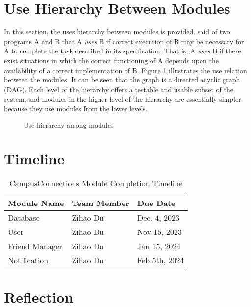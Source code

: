 \documentclass[12pt, titlepage]{article}
\begin{document}
\section{Use Hierarchy Between Modules} \label{SecUse}

In this section, the uses hierarchy between modules is
provided. \citet{Parnas1978} said of two programs A and B that A {\em uses} B if
correct execution of B may be necessary for A to complete the task described in
its specification. That is, A {\em uses} B if there exist situations in which
the correct functioning of A depends upon the availability of a correct
implementation of B.  Figure \ref{FigUH} illustrates the use relation between
the modules. It can be seen that the graph is a directed acyclic graph
(DAG). Each level of the hierarchy offers a testable and usable subset of the
system, and modules in the higher level of the hierarchy are essentially simpler
because they use modules from the lower levels.

\begin{figure}[H]
\centering
\caption{Use hierarchy among modules}
\label{FigUH}
\end{figure}

\section{Timeline}
\begin{table}[H]
\centering
\begin{tabular}{p{} p{}  p{}}
\toprule
Module Name & Team Member & Due Date \\
\midrule
Database & Zihao Du & Dec. 4, 2023\\
User & Zihao Du & Nov 15, 2023\\
Friend Manager & Zihao Du & Jan 15, 2024\\
Notification & Zihao Du & Feb 5th, 2024\\
\bottomrule
\end{tabular}
\caption{CampusConnections Module Completion Timeline}
\end{table}

\newpage{}

\appendix

\section{Reflection}
\end{document}

